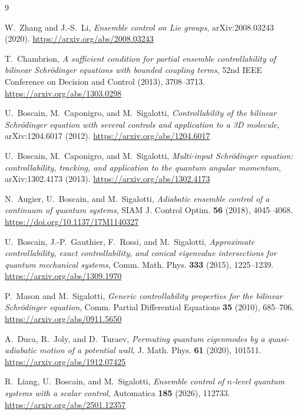 \documentclass[11pt]{article}
\theoremstyle{remark}
\begin{document}
\begin{sloppypar}
\raggedright
\begin{thebibliography}{9}

W.~Zhang and J.-S.~Li,
\emph{Ensemble control on Lie groups},
arXiv:2008.03243 (2020).
\url{https://arxiv.org/abs/2008.03243}

T.~Chambrion,
\emph{A sufficient condition for partial ensemble controllability of bilinear
Schr\"odinger equations with bounded coupling terms},
52nd IEEE Conference on Decision and Control (2013), 3708--3713.
\url{https://arxiv.org/abs/1303.0298}

U.~Boscain, M.~Caponigro, and M.~Sigalotti,
\emph{Controllability of the bilinear Schr\"odinger equation with several
controls and application to a 3D molecule},
arXiv:1204.6017 (2012).
\url{https://arxiv.org/abs/1204.6017}

U.~Boscain, M.~Caponigro, and M.~Sigalotti,
\emph{Multi-input Schr\"odinger equation: controllability, tracking, and
application to the quantum angular momentum},
arXiv:1302.4173 (2013).
\url{https://arxiv.org/abs/1302.4173}

N.~Augier, U.~Boscain, and M.~Sigalotti,
\emph{Adiabatic ensemble control of a continuum of quantum systems},
SIAM J. Control Optim. \textbf{56} (2018), 4045--4068.
\url{https://doi.org/10.1137/17M1140327}

U.~Boscain, J.-P.~Gauthier, F.~Rossi, and M.~Sigalotti,
\emph{Approximate controllability, exact controllability, and conical
eigenvalue intersections for quantum mechanical systems},
Comm. Math. Phys. \textbf{333} (2015), 1225--1239.
\url{https://arxiv.org/abs/1309.1970}

P.~Mason and M.~Sigalotti,
\emph{Generic controllability properties for the bilinear Schr\"odinger
equation},
Comm. Partial Differential Equations \textbf{35} (2010), 685--706.
\url{https://arxiv.org/abs/0911.5650}

A.~Duca, R.~Joly, and D.~Turaev,
\emph{Permuting quantum eigenmodes by a quasi-adiabatic motion of a potential
wall},
J. Math. Phys. \textbf{61} (2020), 101511.
\url{https://arxiv.org/abs/1912.07425}

R.~Liang, U.~Boscain, and M.~Sigalotti,
\emph{Ensemble control of $n$-level quantum systems with a scalar control},
Automatica \textbf{185} (2026), 112733.
\url{https://arxiv.org/abs/2501.12357}


\end{thebibliography}
\end{sloppypar}
\end{document}
